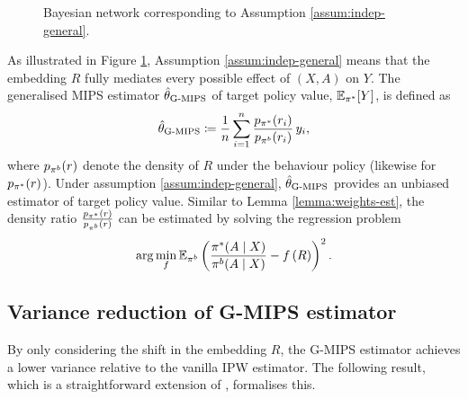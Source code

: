 \begin{figure}[ht]
\centering
{}
\caption{Bayesian network corresponding to Assumption \ref{assum:indep-general}.}
\label{fig:embedding_single}
\end{figure}
As illustrated in Figure \ref{fig:embedding_single}, Assumption \ref{assum:indep-general} means that the embedding $R$ fully mediates every possible effect of $(X, A)$ on $Y$. The generalised MIPS estimator $\hat{\theta}_{\textup{G-MIPS}}$ of target policy value, $\mathbb{E}_{\pi^*}[Y]$, is defined as
\[
\hat{\theta}_{\textup{G-MIPS}} \coloneqq \frac{1}{n}\sum_{i=1}^n \frac{p_{\pi^*}(r_i)}{p_{\pi^b}(r_i)}\, y_i,
\]
where $p_{\pi^b}(r)$ denote the density of $R$ under the behaviour policy (likewise for $p_{\pi^*}(r)$). Under assumption \ref{assum:indep-general}, $\hat{\theta}_{\textup{G-MIPS}}$ provides an unbiased estimator of target policy value. 
Similar to Lemma \ref{lemma:weights-est}, the density ratio $\frac{p_{\pi^*}(r)}{p_{\pi^b}(r)}$ can be estimated by solving the regression problem
\begin{align}
    \arg \min_f \mathbb{E}_{\pi^b} \left(\frac{\pi^*(A\mid X)}{\pi^b(A\mid X)} - f\left(R\right)\right)^2. \label{eq:embedding-ratio-estimation}
\end{align}

\subsection{Variance reduction of G-MIPS estimator}\label{app:gmips-var-reduction}
By only considering the shift in the embedding $R$, the G-MIPS estimator achieves a lower variance relative to the vanilla IPW estimator. The following result, which is a straightforward extension of \cite[Theorem 3.6]{saito2022off}, formalises this.

